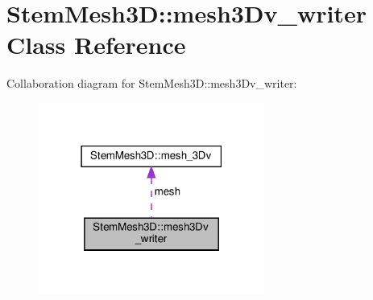 \hypertarget{classStemMesh3D_1_1mesh3Dv__writer}{}\section{Stem\+Mesh3D\+:\+:mesh3\+Dv\+\_\+writer Class Reference}
\label{classStemMesh3D_1_1mesh3Dv__writer}


Collaboration diagram for Stem\+Mesh3D\+:\+:mesh3\+Dv\+\_\+writer\+:\nopagebreak
\begin{figure}[H]
\begin{center}
\leavevmode
\includegraphics[width=210pt]{classStemMesh3D_1_1mesh3Dv__writer__coll__graph}
\end{center}
\end{figure}
